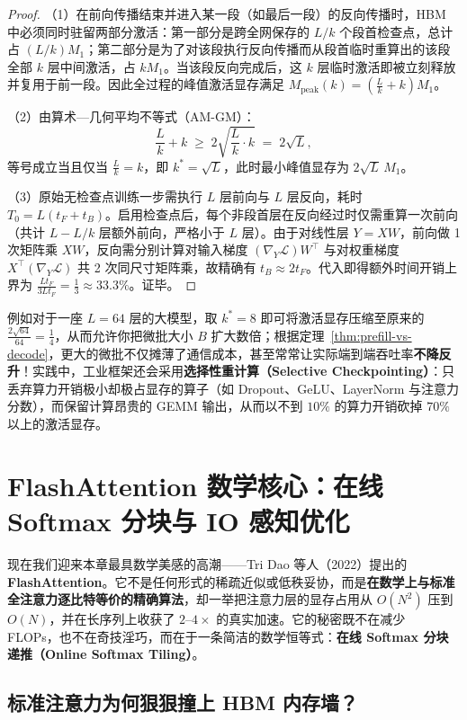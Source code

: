 \begin{proof}
（1）在前向传播结束并进入某一段（如最后一段）的反向传播时，HBM 中必须同时驻留两部分激活：第一部分是跨全网保存的 $L / k$ 个段首检查点，总计占 $(L / k) M_1$；第二部分是为了对该段执行反向传播而从段首临时重算出的该段全部 $k$ 层中间激活，占 $k M_1$。当该段反向完成后，这 $k$ 层临时激活即被立刻释放并复用于前一段。因此全过程的峰值激活显存满足 $M_{\mathrm{peak}}(k) = (\frac{L}{k} + k) M_1$。

（2）由算术—几何平均不等式（AM-GM）：
\[
  \frac{L}{k} + k \;\ge\; 2\sqrt{\frac{L}{k} \cdot k} \;=\; 2\sqrt{L},
\]
等号成立当且仅当 $\frac{L}{k} = k$，即 $k^* = \sqrt{L}$，此时最小峰值显存为 $2\sqrt{L}\,M_1$。

（3）原始无检查点训练一步需执行 $L$ 层前向与 $L$ 层反向，耗时 $T_0 = L(t_F + t_B)$。启用检查点后，每个非段首层在反向经过时仅需重算一次前向（共计 $L - L/k$ 层额外前向，严格小于 $L$ 层）。由于对线性层 $Y = XW$，前向做 1 次矩阵乘 $XW$，反向需分别计算对输入梯度 $(\nabla_Y \mathcal{L}) W^\top$ 与对权重梯度 $X^\top (\nabla_Y \mathcal{L})$ 共 2 次同尺寸矩阵乘，故精确有 $t_B \approx 2 t_F$。代入即得额外时间开销上界为 $\frac{L t_F}{3 L t_F} = \frac{1}{3} \approx 33.3\%$。证毕。
\end{proof}

例如对于一座 $L = 64$ 层的大模型，取 $k^* = 8$ 即可将激活显存压缩至原来的 $\frac{2\sqrt{64}}{64} = \frac{1}{4}$，从而允许你把微批大小 $B$ 扩大数倍；根据定理~\ref{thm:prefill-vs-decode}，更大的微批不仅摊薄了通信成本，甚至常常让实际端到端吞吐率\textbf{不降反升}！实践中，工业框架还会采用\textbf{选择性重计算（Selective Checkpointing）}：只丢弃算力开销极小却极占显存的算子（如 Dropout、GeLU、LayerNorm 与注意力分数），而保留计算昂贵的 GEMM 输出，从而以不到 $10\%$ 的算力开销砍掉 $70\%$ 以上的激活显存。

\section{FlashAttention 数学核心：在线 Softmax 分块与 IO 感知优化}
\label{sec:flash-attention}

现在我们迎来本章最具数学美感的高潮——Tri Dao 等人（2022）提出的 \textbf{FlashAttention}。它不是任何形式的稀疏近似或低秩妥协，而是\textbf{在数学上与标准全注意力逐比特等价的精确算法}，却一举把注意力层的显存占用从 $O(N^2)$ 压到 $O(N)$，并在长序列上收获了 $2\text{--}4\times$ 的真实加速。它的秘密既不在减少 FLOPs，也不在奇技淫巧，而在于一条简洁的数学恒等式：\textbf{在线 Softmax 分块递推（Online Softmax Tiling）}。

\subsection{标准注意力为何狠狠撞上 HBM 内存墙？}

